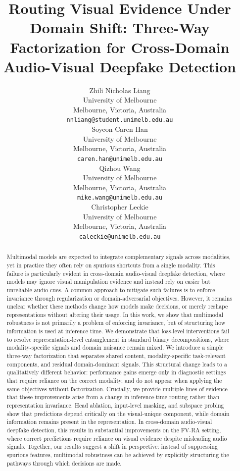 \documentclass{article}
\title{Routing Visual Evidence Under Domain Shift: Three-Way Factorization for Cross-Domain Audio-Visual Deepfake Detection}
\author{%
  Zhili Nicholas Liang \\
  University of Melbourne \\
  Melbourne, Victoria, Australia \\
  \texttt{nnliang@student.unimelb.edu.au} \\
  \And
  Soyeon Caren Han \\
  University of Melbourne \\
  Melbourne, Victoria, Australia \\
  \texttt{caren.han@unimelb.edu.au} \\
  \And
  Qizhou Wang \\
  University of Melbourne \\
  Melbourne, Victoria, Australia \\
  \texttt{mike.wang@unimelb.edu.au} \\
  \And
  Christopher Leckie \\
  University of Melbourne \\
  Melbourne, Victoria, Australia \\
  \texttt{caleckie@unimelb.edu.au} \\
}
\begin{document}
\maketitle

\begin{abstract}
Multimodal models are expected to integrate complementary signals across modalities, yet in practice they often rely on spurious shortcuts from a single modality. This failure is particularly evident in cross-domain audio-visual deepfake detection, where models may ignore visual manipulation evidence and instead rely on easier but unreliable audio cues. A common approach to mitigate such failures is to enforce invariance through regularization or domain-adversarial objectives. However, it remains unclear whether these methods change how models make decisions, or merely reshape representations without altering their usage. In this work, we show that multimodal robustness is not primarily a problem of enforcing invariance, but of structuring how information is used at inference time. We demonstrate that loss-level interventions fail to resolve representation-level entanglement in standard binary decompositions, where modality-specific signals and domain nuisance remain mixed.
We introduce a simple three-way factorization that separates shared content, modality-specific task-relevant components, and residual domain-dominant signals. This structural change leads to a qualitatively different behavior: performance gains emerge only in diagnostic settings that require reliance on the correct modality, and do not appear when applying the same objectives without factorization. Crucially, we provide multiple lines of evidence that these improvements arise from a change in inference-time routing rather than representation invariance. Head ablation, input-level masking, and subspace probing show that predictions depend critically on the visual-unique component, while domain information remains present in the representation. In cross-domain audio-visual deepfake detection, this results in substantial improvements on the FV-RA setting, where correct predictions require reliance on visual evidence despite misleading audio signals. Together, our results suggest a shift in perspective: instead of suppressing spurious features, multimodal robustness can be achieved by explicitly structuring the pathways through which decisions are made.
\end{abstract}
\end{document}
